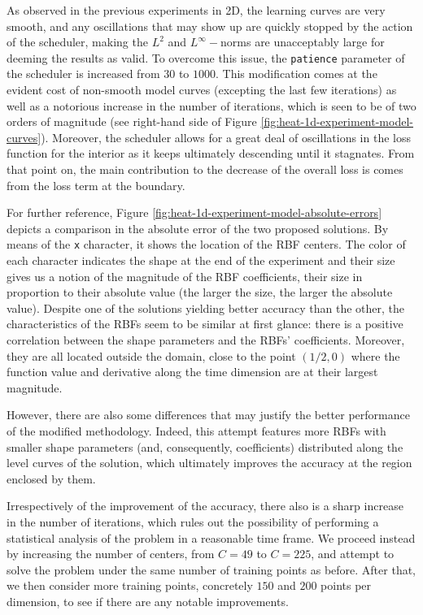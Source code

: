\documentclass[12pt]{report} %
\begin{document}
As observed in the previous experiments in 2D, the learning curves are very smooth, and any oscillations that may show up are quickly stopped by the action of the scheduler, making the $L^2$ and $L^\infty-$norms are unacceptably large for deeming the results as valid. To overcome this issue, the \texttt{patience} parameter of the scheduler is increased from $30$ to $1000$. This modification comes at the evident cost of non-smooth model curves (excepting the last few iterations) as well as a notorious increase in the number of iterations, which is seen to be of two orders of magnitude (see right-hand side of Figure \ref{fig:heat-1d-experiment-model-curves}). Moreover, the scheduler allows for a great deal of oscillations in the loss function for the interior as it keeps ultimately descending until it stagnates. From that point on, the main contribution to the decrease of the overall loss is comes from the loss term at the boundary.

For further reference, Figure \ref{fig:heat-1d-experiment-model-absolute-errors} depicts a comparison in the absolute error of the two proposed solutions. By means of the \texttt{x} character, it shows the location of the RBF centers. The color of each character indicates the shape at the end of the experiment and their size gives us a notion of the magnitude of the RBF coefficients, their size in proportion to their absolute value (the larger the size, the larger the absolute value). Despite one of the solutions yielding better accuracy than the other, the characteristics of the RBFs seem to be similar at first glance: there is a positive correlation between the shape parameters and the RBFs' coefficients. Moreover, they are all located outside the domain, close to the point $(1/2,0)$ where the function value and derivative along the time dimension are at their largest magnitude. 

However, there are also some differences that may justify the better performance of the modified methodology. Indeed, this attempt features more RBFs with smaller shape parameters (and, consequently, coefficients) distributed along the level curves of the solution, which ultimately improves the accuracy at the region enclosed by them. 

Irrespectively of the improvement of the accuracy, there also is a sharp increase in the number of iterations, which rules out the possibility of performing a statistical analysis of the problem in a reasonable time frame. We proceed instead by increasing the number of centers, from $C=49$ to $C=225$, and attempt to solve the problem under the same number of training points as before. After that, we then consider more training points, concretely $150$ and $200$ points per dimension, to see if there are any notable improvements. 
\end{document}
